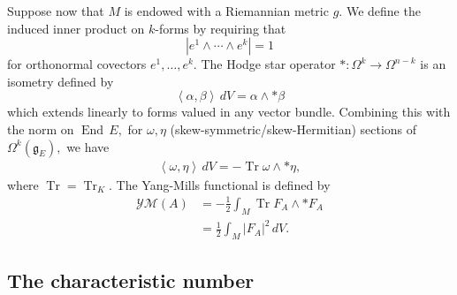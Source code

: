 \documentclass[12pt]{amsart}
\newcommand{\Tr}{\operatorname{Tr}}
\newcommand{\LA}{\left\langle}
\newcommand{\RA}{\right\rangle}
\renewcommand{\1}{{\mathbf 1}}
\newcommand{\gothg}{{\mathfrak g}}
\newcommand{\End}{{\operatorname{End} \,}}
\theoremstyle{others}
\numberwithin{equation}{section}
\begin{document}
Suppose now that $M$ is endowed with a Riemannian metric $g.$ We define the induced inner product on $k$-forms by requiring that
$$|e^1 \wedge \cdots \wedge e^k| = 1$$
for orthonormal covectors $e^1, \ldots, e^k.$ The Hodge star operator $* : \Omega^k \to \Omega^{n-k}$ is an isometry defined by
\[
\LA \alpha, \beta \RA \, dV = \alpha \wedge * \beta
\]
which extends linearly to forms valued in any vector bundle.
Combining this with the norm on $\End E,$ for $\omega, \eta$ (skew-symmetric/skew-Hermitian) sections of $\Omega^k(\gothg_E),$ we have
\begin{align}\label{preliminaries:forminnerproduct}
\LA \omega, \eta \RA \, dV = - \Tr \omega \wedge * \eta,
\end{align}
where $\Tr = \Tr_K.$ The Yang-Mills functional is defined by 
\begin{align}\label{preliminaries:ym}
   \mathcal{YM}(A) & = - \frac12 \int_M \Tr F_A \wedge * F_A \\
& = \frac12 \int_M |F_A|^2 \, dV . \nonumber
\end{align}



\vspace{5mm}

\subsection{The characteristic number}\label{ss:characteristicnumber}
\end{document}
